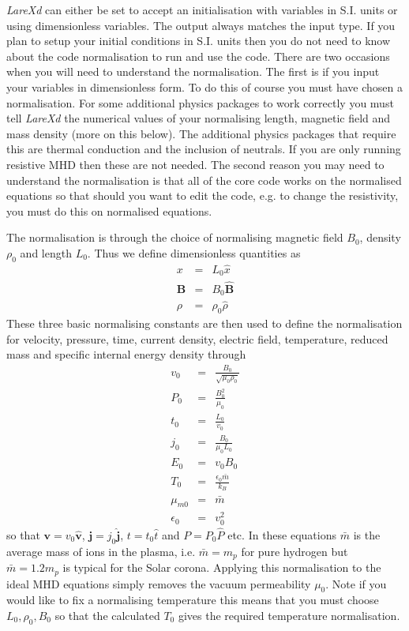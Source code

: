 \documentclass[11pt]{article}
\begin{document}
 {\it LareXd} can either be set to accept an initialisation with variables in S.I. units or using dimensionless variables. The output always matches the input type. If you plan to setup your initial conditions in S.I. units then you do not need to know about the code normalisation to run and use the code. There are two occasions when you will need to understand the normalisation. The first is if you input your variables in dimensionless form. To do this of course you must have chosen a normalisation. For some additional physics packages to work correctly you must tell {\it LareXd} the numerical values of your normalising length, magnetic field and mass density (more on this below). The additional physics packages that require this are thermal conduction and the inclusion of neutrals. If you are only running resistive MHD then these are not needed. The second reason you may need to understand the normalisation is that all of the core code works on the normalised equations so that should you want to edit the code, e.g. to change the resistivity, you must do this on normalised equations.  
 
The normalisation is through the choice of normalising magnetic field $B_0$, density $\rho_0$ and length $L_0$. Thus we define dimensionless quantities as
\begin{eqnarray*}
x&=&L_0 \hat{x}\\
\mathbf{B}&=&B_0\hat{\mathbf{B}} \\
\rho&=&\rho_0 \hat{\rho}
\end{eqnarray*}
These three basic normalising constants are then used to define the normalisation for velocity, pressure, time, current density, electric field, temperature, reduced mass and specific internal energy density through
\begin{eqnarray*}
v_{0}&=&\frac{B_{0}}{\sqrt{\mu_{0}\rho_{0}}}\\
P_{0}&=&\frac{B^{2}_{0}}{\mu_{0}} \\
t_0&=&\frac{L_0}{v_0}\\
j_{0}&=&\frac{B_{0}}{\mu_{0}L_{0}}\\
E_0&=&v_0 B_0\\
T_0&=&\frac{\epsilon_0 \bar{m}}{k_B}\\
\mu_{m0}&=&\bar{m}\\
\epsilon_0&=&v_0^2
\end{eqnarray*}
so that $\mathbf{v}=v_0\hat{\mathbf{v}}$, $\mathbf{j}=j_0\hat{\mathbf{j}}$, $t=t_0\hat{t}$ and $P=P_0\hat{P}$ etc. In these equations $\bar{m}$ is the average mass of ions in the plasma, i.e. $\bar{m}=m_p$ for pure hydrogen but  $\bar{m}=1.2 m_p$ is typical for the Solar corona. Applying this normalisation to the ideal MHD equations simply removes the vacuum permeability $\mu_0$. Note if you would like to fix a normalising temperature this means that you must choose $L_0,\rho_0, B_0$ so that the calculated $T_0$ gives the required temperature normalisation.
\end{document}
